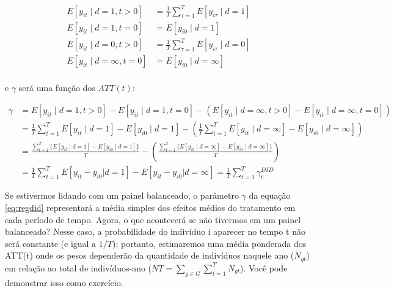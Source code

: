\documentclass[portugues]{article}
\begin{document}
\[
\begin{split}
    E\left[y_{i t} \mid d=1, t > 0\right] &= \frac{1}{T} \sum_{\tau=1}^{T} E[y_{i\tau} \mid d=1] \\
    E\left[y_{it} \mid d=1, t = 0\right] &=  E[y_{i0} \mid d=1] \\
      E\left[y_{it} \mid d=0, t > 0\right] &= \frac{1}{T}\sum_{\tau=1}^{T} E[y_{i\tau} \mid d=0] \\
     E\left[y_{i t} \mid d=\infty, t = 0\right] &= E[y_{i0} \mid d=\infty] \\
\end{split}
\]

 \noindent e $\gamma$ será uma função dos $ATT(t)$:

\[\begin{split}
    \gamma &= E\left[y_{i t} \mid d=1, t > 0\right] - E\left[y_{it} \mid d=1, t = 0\right] - ( E\left[y_{it} \mid d=\infty, t > 0\right] - E\left[y_{it} \mid d=\infty, t = 0\right]) \\
    &= \frac{1}{T} \sum_{t=1}^{T} E[y_{it} \mid d=1] - E[y_{i0} \mid d=1] - \left( \frac{1}{T}\sum_{t=1}^{T} E[y_{it} \mid d= \infty] - E[y_{i0} \mid d=\infty]\right)
    \\
    &= \frac{\sum_{t=1}^{T} \{E[y_{it} \mid d=1] - E[y_{i0} \mid d=1]\}}{T} -  \left( \frac{\sum_{t=1}^{T} \{ E[y_{it} \mid d= \infty] - E[y_{i0} \mid d=\infty]\}}{T}\right) \\
    &= \frac{1}{T} \sum_{t=1}^{T}  E[y_{it} - y_{i0}|d=1] - E[y_{it} - y_{i0}|d=\infty] = \frac{1}{T} \sum_{t=1}^{T} \gamma_{t}^{DID} 
\end{split}\]

Se estivermos lidando com um painel balanceado, o parâmetro $\gamma$ da equação \eqref{eq:regdid} representará a média simples dos efeitos médios do tratamento em cada período de tempo. Agora, o que acontecerá se não tivermos em um painel balanceado? Nesse caso, a probabilidade do indivíduo i aparecer no tempo t não será constante (e igual a $1/T$); portanto, estimaremos uma média ponderada dos ATT(t) onde os pesos dependerão da quantidade de indivíduos naquele ano ($N_{gt}$) em relação ao total de indivíduos-ano ($NT = \sum _{g \in G} \sum_{t=1}^{T} N_{gt}$). Você pode demonstrar isso como exercício.
\end{document}

